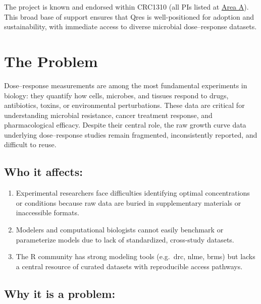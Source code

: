 \documentclass[
]{article}
\providecommand{\tightlist}{%
  \setlength{\itemsep}{0pt}\setlength{\parskip}{0pt}}
\begin{document}
The project is known and endorsed within CRC1310 (all PIs listed at
\href{crc1310.uni-koeln.de/project_a.html}{Area A}). This broad base of
support ensures that Qres is well-positioned for adoption and
sustainability, with immediate access to diverse microbial
dose--response datasets.

\section{The Problem}\label{the-problem}

Dose--response measurements are among the most fundamental experiments
in biology: they quantify how cells, microbes, and tissues respond to
drugs, antibiotics, toxins, or environmental perturbations. These data
are critical for understanding microbial resistance, cancer treatment
response, and pharmacological efficacy. Despite their central role, the
raw growth curve data underlying dose--response studies remain
fragmented, inconsistently reported, and difficult to reuse.

\subsection{Who it affects:}\label{who-it-affects}

\begin{enumerate}
\def\labelenumi{\arabic{enumi}.}
\tightlist
\item
  Experimental researchers face difficulties identifying optimal
  concentrations or conditions because raw data are buried in
  supplementary materials or inaccessible formats.
\item
  Modelers and computational biologists cannot easily benchmark or
  parameterize models due to lack of standardized, cross-study datasets.
\item
  The R community has strong modeling tools (e.g.~drc, nlme, brms) but
  lacks a central resource of curated datasets with reproducible access
  pathways.
\end{enumerate}

\subsection{Why it is a problem:}\label{why-it-is-a-problem}
\end{document}
